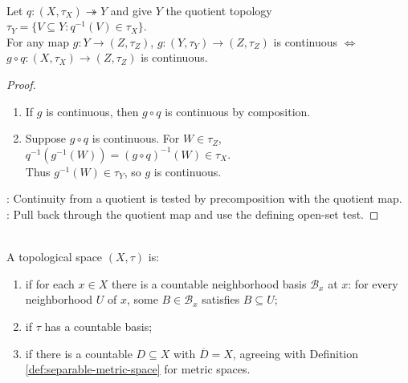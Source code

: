 \begin{proposition} \label{prop:quotient-topology-universal-property} \\
Let $q:(X,\tau_X)\twoheadrightarrow Y$ and give $Y$ the quotient topology $\tau_Y=\{V\subseteq Y:q^{-1}(V)\in\tau_X\}$.\\
For any map $g:Y\to (Z,\tau_Z)$, $g:(Y,\tau_Y)\to (Z,\tau_Z)$ is continuous $\Longleftrightarrow$ $g\circ q:(X,\tau_X)\to (Z,\tau_Z)$ is continuous.
\begin{proof}
\begin{enumerate}[label=\roman*.]
\setlength{\itemsep}{0pt}
\item[$(\Rightarrow)$] If $g$ is continuous, then $g\circ q$ is continuous by composition.
\item[$(\Leftarrow)$] Suppose $g\circ q$ is continuous. For $W\in\tau_Z$, $q^{-1}(g^{-1}(W))=(g\circ q)^{-1}(W)\in\tau_X$.\\
Thus $g^{-1}(W)\in\tau_Y$, so $g$ is continuous.
\end{enumerate}
: Continuity from a quotient is tested by precomposition with the quotient map.\\
: Pull back through the quotient map and use the defining open-set test.
\end{proof}
\end{proposition}

\begin{definition} \label{def:topological-countability-axioms} \\
A topological space $(X,\tau)$ is:
\begin{enumerate}[label=(\roman*)]
\setlength{\itemsep}{0pt}
\item {} if for each $x\in X$ there is a countable neighborhood basis $\mathcal{B}_x$ at $x$: for every neighborhood $U$ of $x$, some $B\in\mathcal{B}_x$ satisfies $B\subseteq U$;
\item {} if $\tau$ has a countable basis;
\item {} if there is a countable $D\subseteq X$ with $\overline{D}=X$, agreeing with Definition \ref{def:separable-metric-space} for metric spaces.
\end{enumerate}
\end{definition}

